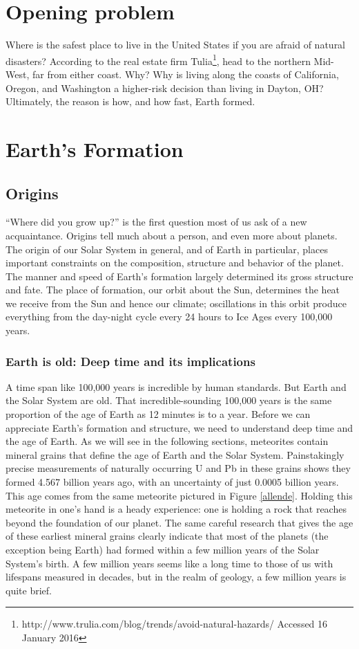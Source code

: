 \documentclass[amstex,12pt]{book}
\begin{document}
\section{Opening problem} \label{Opening Problem}
Where is the safest place to live in the United States if you are afraid of natural disasters? According to the real estate firm Tulia\footnote{http://www.trulia.com/blog/trends/avoid-natural-hazards/ Accessed 16 January 2016}, head to the northern Mid-West, far from either coast. Why? Why is living along the coasts of California, Oregon, and Washington a higher-risk decision than living in Dayton, OH? Ultimately, the reason is how, and how fast, Earth formed. 

\section{Earth's Formation}  \label{Earth's Formation}
\subsection{Origins}
``Where did you grow up?'' is the first question most of us ask of a new acquaintance. Origins tell much about a person, and even more about planets. The origin of our Solar System in general, and of Earth in particular, places important constraints on the composition, structure and behavior of the planet. The manner and speed of Earth's formation largely determined its gross structure and fate. The place of formation, our orbit about the Sun, determines the heat we receive from the Sun and hence our climate; oscillations in this orbit produce everything from the day-night cycle every 24 hours to Ice Ages every 100,000 years. 

\subsubsection{Earth is old: Deep time and its implications}
A time span like 100,000 years is incredible by human standards. But Earth and the Solar System are old. That incredible-sounding 100,000 years is the same proportion of the age of Earth as 12 minutes is to a year. Before we can appreciate Earth's formation and structure, we need to understand deep time and the age of Earth. As we will see in the following sections, meteorites contain mineral grains that define the age of Earth and the Solar System. Painstakingly precise measurements of naturally occurring U and Pb in these grains shows they formed 4.567 billion years ago, with an uncertainty of just 0.0005 billion years. This age comes from the same meteorite pictured in Figure \ref{allende}. Holding this meteorite in one's hand is a heady experience: one is holding a rock that reaches beyond the foundation of our planet. The same careful research that gives the age of these earliest mineral grains clearly indicate that most of the planets (the exception being Earth) had formed within a few million years of the Solar System's birth. A few million years seems like a long time to those of us with lifespans measured in decades, but in the realm of geology, a few million years is quite brief.\\
\end{document}
